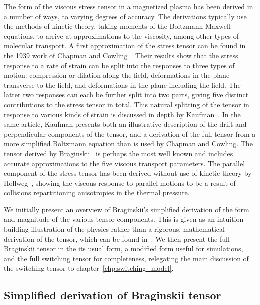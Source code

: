 The form of the viscous stress tensor in a magnetized plasma has been derived in a number of ways, to varying degrees of accuracy. The derivations typically use the methods of kinetic theory, taking moments of the Boltzmann-Maxwell equations, to arrive at approximations to the viscosity, among other types of molecular transport. A first approximation of the stress tensor can be found in the 1939 work of Chapman and Cowling~\cite{chapmanMathematicalTheoryNonuniform1970}. Their results show that the stress response to a rate of strain can be split into the responses to three types of motion: compression or dilation along the field, deformations in the plane transverse to the field, and deformations in the plane including the field. The latter two responses can each be further split into two parts, giving five distinct contributions to the stress tensor in total. This natural splitting of the tensor in response to various kinds of strain is discussed in depth by Kaufman~\cite{kaufmanPlasmaViscosityMagnetic1960}. In the same article, Kaufman presents both an illustrative description of the drift and perpendicular components of the tensor, and a derivation of the full tensor from a more simplified Boltzmann equation than is used by Chapman and Cowling. The tensor derived by Braginskii~\cite{braginskiiTransportProcessesPlasma1965} is perhaps the most well known and includes accurate approximations to the five viscous transport parameters. The parallel component of the stress tensor has been derived without use of kinetic theory by Hollweg~\cite{hollwegViscosityMagnetizedPlasma1985}, showing the viscous response to parallel motions to be a result of collisions repartitioning anisotropies in the thermal pressure.

We initially present an overview of Braginskii's simplified derivation of the form and magnitude of the various tensor components. This is given as an intuition-building illustration of the physics rather than a rigorous, mathematical derivation of the tensor, which can be found in~\cite{braginskiiTransportProcessesPlasma1965}. We then present the full Braginskii tensor in the its usual form, a modified form useful for simulations, and the full switching tensor for completeness, relegating the main discussion of the switching tensor to chapter~\ref{chp:switching_model}.

\subsection{Simplified derivation of Braginskii tensor}

